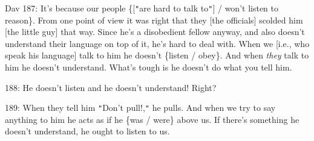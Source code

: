 Dav 187: It's because our people \{[\texttt{"}are hard to talk to\texttt{"}] /
won't listen to reason\}. From one point of view it was right that they [the officials]
scolded him [the little guy] that way. Since he's a disobedient fellow anyway,
and also doesn't understand their language on top of it, he's hard to deal with.
When we [i.e., who speak his language] talk to him he doesn't \{listen / obey\}.
And when \textit{they} talk to him he doesn't understand. What's tough is he doesn't
do what you tell him.

188: He doesn't listen and he doesn't understand! Right?

189: When they tell him \texttt{"}Don't pull!,\texttt{"} he pulls. And when we
try to say anything to him he acts as if he \{was / were\} above us. If there's
something he doesn't understand, he ought to listen to us.


